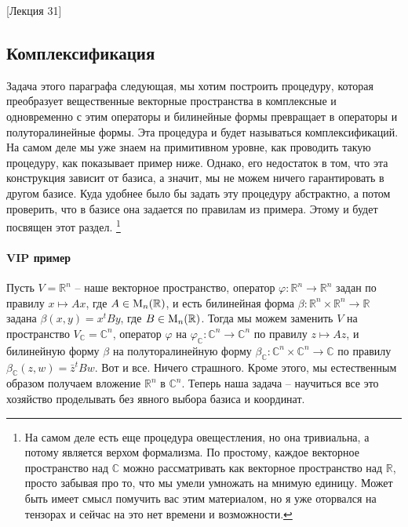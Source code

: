 [Лекция 31]


\subsection{Комплексификация}

Задача этого параграфа следующая, мы хотим построить процедуру, которая преобразует вещественные векторные пространства в комплексные и одновременно с этим операторы и билинейные формы превращает в операторы и полуторалинейные формы.
Эта процедура и будет называться комплексификаций.
На самом деле мы уже знаем на примитивном уровне, как проводить такую процедуру, как показывает пример ниже.
Однако, его недостаток в том, что эта конструкция зависит от базиса, а значит, мы не можем ничего гарантировать в другом базисе.
Куда удобнее было бы задать эту процедуру абстрактно, а потом проверить, что в базисе она задается по правилам из примера.
Этому и будет посвящен этот раздел.%
\footnote{На самом деле есть еще процедура овещестления, но она тривиальна, а потому является верхом формализма.
По простому, каждое векторное пространство над $\mathbb C$ можно рассматривать как векторное пространство над $\mathbb R$, просто забывая про то, что мы умели умножать на мнимую единицу.
Может быть имеет смысл помучить вас этим материалом, но я уже оторвался на тензорах и сейчас на это нет времени и возможности.}

\paragraph{VIP пример}

Пусть $V = \mathbb R^n$ -- наше векторное пространство, оператор $\varphi \colon \mathbb R^n\to \mathbb R^n$ задан по правилу $x \mapsto Ax$, где $A\in \operatorname{M}_{n}(\mathbb R)$, и есть билинейная форма $\beta \colon \mathbb R^n\times \mathbb R^n\to \mathbb R$ задана $\beta(x,y) = x^t By$, где $B\in \operatorname{M}_{n}(\mathbb R)$.
Тогда мы можем заменить $V$ на пространство $V_{\mathbb C} = \mathbb C^n$, оператор $\varphi$ на $\varphi_{\mathbb C}\colon \mathbb C^n \to \mathbb C^n$ по правилу $z\mapsto Az$, и билинейную форму $\beta$ на полуторалинейную форму $\beta_{\mathbb C}\colon \mathbb C^n \times \mathbb C^n \to \mathbb C$ по правилу $\beta_{\mathbb C}(z, w)= \bar z^t B w$.
Вот и все.
Ничего страшного.
Кроме этого, мы естественным образом получаем вложение $\mathbb R^n$ в $\mathbb C^n$.
Теперь наша задача -- научиться все это хозяйство проделывать без явного выбора базиса и координат.


